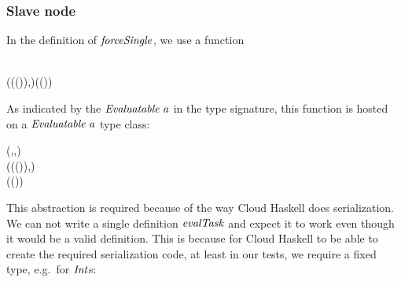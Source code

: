 \documentclass[paper=A4,twoside=true,openright,parskip=full,chapterprefix=true,headings=normal,bibliography=totoc,listof=totoc,titlepage=on,captions=tableabove,draft=false,british]{scrreprt}%
\begin{document}
\vspace{-2\baselineskip}

\hypertarget{slave-node}{%
\subsubsection{Slave node}\label{slave-node}}

\label{sec:cloudhaskellparEvalSlaveNode}

In the definition of \ensuremath{\Varid{forceSingle}}, we use a function


\begin{hscode}\SaveRestoreHook
{}%
%
%
\>[B]{}\mathbin{::}{}\<[E]%
\\
\>[B]{}\<[5]%
\>[5]{}(\;(\;(\;)),\;)\to {}\;(\;()){}\<[E]%
\ColumnHook
\end{hscode}\resethooks
\vspace{-2\baselineskip}

As indicated by the \ensuremath{\Conid{Evaluatable}\;\Varid{a}} in the type signature, this function
is hosted on a \ensuremath{\Conid{Evaluatable}\;\Varid{a}} type class:


\begin{hscode}\SaveRestoreHook
{}%
%
%
%
\>[B]{}\;(\;,\;,\;)\Rightarrow {}\;\;\<[E]%
\\
\>[B]{}\<[5]%
\>[5]{}\mathbin{::}(\;(\;(\;)),\;)\to {}\<[E]%
\\
\>[5]{}\<[9]%
\>[9]{}\;(\;()){}\<[E]%
\ColumnHook
\end{hscode}\resethooks
\vspace{-2\baselineskip}

This abstraction is required because of the way Cloud Haskell does
serialization. We can not write a single definition \ensuremath{\Varid{evalTask}} and
expect it to work even though it would be a valid definition. This is
because for Cloud Haskell to be able to create the required
serialization code, at least in our tests, we require a fixed type,
e.g.~for \ensuremath{\Conid{Int}}s:
\end{document}
